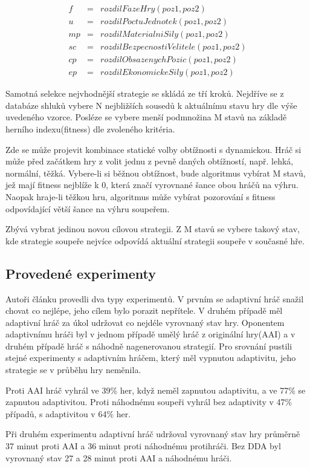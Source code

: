 \begin{eqnarray*}
f &= &rozdilFazeHry(poz1,poz2) \\
u &= &rozdilPoctuJednotek(poz1,poz2) \\
mp &= &rozdilMaterialniSily(poz1,poz2) \\
sc &= &rozdilBezpecnostiVelitele(poz1,poz2) \\
cp &= &rozdilObsazenychPozic(poz1,poz2) \\
ep &= &rozdilEkonomickeSily(poz1,poz2)
\end{eqnarray*}

Samotná selekce nejvhodnější strategie se skládá ze tří kroků. Nejdříve se z databáze shluků vybere N nejbližších sousedů k aktuálnímu stavu hry dle výše uvedeného vzorce. Posléze se vybere menší podmnožina M stavů na základě herního indexu(fitness) dle zvoleného kritéria.

Zde se může projevit kombinace statické volby obtížnosti s dynamickou. Hráč si může před začátkem hry z volit jednu z pevně daných obtížností, např. lehká, normální, těžká. Vybere-li si běžnou obtížnost, bude algoritmus vybírat M stavů, jež mají fitness nejblíže k 0, která značí vyrovnané šance obou hráčů na výhru. Naopak hraje-li těžkou hru, algoritmus může vybírat pozorování s fitness odpovídající větší šance na výhru soupeřem.

Zbývá vybrat jedinou novou cílovou strategii. Z M stavů se vybere takový stav, kde strategie soupeře nejvíce odpovídá aktuální strategii soupeře v současné hře.

\subsection{Provedené experimenty}

Autoři článku provedli dva typy experimentů. V prvním se adaptivní hráč snažil chovat co nejlépe, jeho cílem bylo porazit nepřítele. V druhém případě měl adaptivní hráč za úkol udržovat co nejdéle vyrovnaný stav hry. Oponentem adaptivnímu hráči byl v jednom případě umělý hráč z originální hry(AAI) a v druhém případě hráč s náhodně nagenerovanou strategií. Pro srovnání pustili stejné experimenty s adaptivním hráčem, který měl vypnutou adaptivitu, jeho strategie se v průběhu hry neměnila.

Proti AAI hráč vyhrál ve 39\% her, když neměl zapnutou adaptivitu, a ve 77\% se zapnutou adaptivitou. Proti náhodnému soupeři vyhrál bez adaptivity v 47\% případů, s adaptivitou v 64\% her.

Při druhém experimentu adaptivní hráč udržoval vyrovnaný stav hry průměrně 37 minut proti AAI a 36 minut proti náhodnému protihráči. Bez DDA byl vyrovnaný stav 27 a 28 minut proti AAI a náhodnému hráči.

